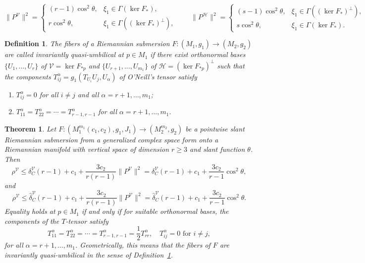 \documentclass[10pt,a4paper]{amsart}
\newtheorem{definition}{Definition}
\newtheorem{theorem}{Theorem}
\newcommand{\calH}{\mathcal{H}}
\newcommand{\calV}{\mathcal{V}}
\begin{document}
\begin{equation}\label{eq:norm_identity_contact}
  \|P^{\mathcal{V}}\|^2 =
  \begin{cases}
    (r-1)\cos^2\theta, & \xi_1\in\Gamma(\ker F_*),\\[2pt]
    r\cos^2\theta, & \xi_1\in\Gamma((\ker F_*)^{\perp}),
  \end{cases}
  \qquad
  \|P^{\mathcal{H}}\|^2 =
  \begin{cases}
    (s-1)\cos^2\theta, & \xi_1\in\Gamma((\ker F_*)^{\perp}),\\[2pt]
    s\cos^2\theta, & \xi_1\in\Gamma(\ker F_*).
  \end{cases}
\end{equation}

\begin{definition}\label{def:quasi-umbilical}
The fibers of a Riemannian submersion $F:(M_1,g_1)\to(M_2,g_2)$ are called
{invariantly quasi-umbilical} at $p\in M_1$ if there exist orthonormal
bases $\{U_1,\ldots,U_r\}$ of $\calV=\ker F_{*p}$ and
$\{U_{r+1},\ldots,U_{m_1}\}$ of $\calH=(\ker F_{*p})^{\perp}$ such that the
components $T_{ij}^{\alpha}=g_1(T_{U_i}U_j,U_\alpha)$ of O'Neill's tensor
satisfy
\begin{enumerate}[label=(\roman*)]
\item $T_{ij}^\alpha = 0$ for all $i \neq j$ and all
      $\alpha = r+1, \ldots, m_1$;
\item $T_{11}^\alpha = T_{22}^\alpha = \cdots =
      T_{r-1,r-1}^\alpha$ for all $\alpha = r+1, \ldots, m_1$.
\end{enumerate}
\end{definition}

\begin{theorem}\label{thm:complex_subm_vert}
Let $F:(M_1^{m_1}(c_1,c_2),g_1,J_1)\to (M_2^{m_2},g_2)$ be a pointwise slant Riemannian submersion from a generalized complex space form onto a Riemannian manifold with vertical space of dimension $r\ge 3$ and slant function $\theta$. Then
\begin{equation}\label{eq:complex_subm_vert_delta}
\rho^{\calV} \le \delta_C^{\calV}(r-1) + c_1 + \dfrac{3c_2}{r(r-1)}\|P^{\mathcal V}\|^2 = \delta_C^{\calV}(r-1) + c_1 + \dfrac{3c_2}{r-1}\cos^2\theta,
\end{equation}
and
\begin{equation}\label{eq:complex_subm_vert_delta_hat}
\rho^{\calV} \le \hat{\delta}_C^{\calV}(r-1) + c_1 + \dfrac{3c_2}{r(r-1)}\|P^{\mathcal V}\|^2 = \hat{\delta}_C^{\calV}(r-1) + c_1 + \dfrac{3c_2}{r-1}\cos^2\theta.
\end{equation}
Equality holds at $p \in M_1$ if and only if for suitable orthonormal 
bases, the components of the $T$-tensor satisfy
\[
T_{11}^{\alpha} = T_{22}^{\alpha} = \cdots = T_{r-1,r-1}^{\alpha} 
= \dfrac{1}{2}T_{rr}^{\alpha}, \quad T_{ij}^{\alpha} = 0 \text{ for } i\neq j,
\]
for all $\alpha = r+1,\ldots,m_1$. Geometrically, this means that the 
fibers of $F$ are invariantly quasi-umbilical in the sense of 
Definition~\ref{def:quasi-umbilical}. 
\end{theorem}
\end{document}
